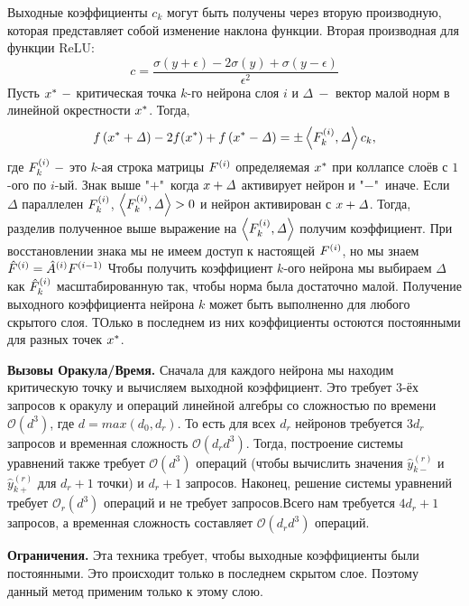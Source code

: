 Выходные коэффициенты $c_{k}$ могут быть получены через вторую производную, которая представляет собой изменение наклона функции. Вторая производная для функции ReLU:
$$c = \frac{\sigma(y+\epsilon)-2\sigma(y)+\sigma(y-\epsilon)}{\epsilon^{2}}$$
Пусть $\mathnormal{x}^{*} ~-$ критическая точка $k$-го нейрона слоя $i$ и $\mathit{\Delta} ~-$ вектор малой норм в линейной окрестности  $\mathnormal{x}^{*}$. Тогда,
$$\mathnormal{f}\left(\mathnormal{x}^{*}+\mathit{\Delta}\right)-2\mathnormal{f(x^{*})}+\mathnormal{f}\left(\mathnormal{x}^{*}-\mathit{\Delta}\right)=\pm\left\langle\mathnormal{F}_{k}^{\left(i\right)},\mathit{\Delta}\right\rangle c_{k},$$
где $\mathnormal{F}_{k}^{\left(i\right)} ~-$ это $k$-ая строка матрицы $\mathnormal{F}^{\left(i\right)}$ определяемая $\mathnormal{x}^{*}$ при коллапсе слоёв с $1$-ого по $i$-ый. Знак выше "$+$"\ когда $\mathnormal{x}+\mathit{\Delta}$ активирует нейрон и "$-$"\ иначе. Если $\mathit{\Delta}$ параллелен $\mathnormal{F}_{k}^{\left(i\right)}$, $\left\langle\mathnormal{F}_{k}^{\left(i\right)},\mathit{\Delta}\right\rangle > 0$ и нейрон активирован с $\mathnormal{x}+\mathit{\Delta}$. Тогда, разделив полученное выше выражение на $\left\langle\mathnormal{F}_{k}^{\left(i\right)},\mathit{\Delta}\right\rangle$ получим коэффициент. При восстановлении знака мы не имеем доступ к настоящей  $\mathnormal{F}^{\left(i\right)}$, но мы знаем $\hat{\mathnormal{F}}^{\left(i\right)}=\hat{A}^{(i)}\mathnormal{F}^{(i-1)}$ Чтобы получить коэффициент $k$-ого нейрона мы выбираем $\mathit{\Delta}$ как $\hat{\mathnormal{F}}_{k}^{\left(i\right)}$ масштабированную так, чтобы норма была достаточно малой. Получение выходного коэффициента нейрона $k$  может быть выполненно для любого скрытого слоя. ТОлько в последнем из них коэффициенты остоются постоянными для разных точек $\mathnormal{x}^{*}$.

\textbf{Вызовы Оракула/Время.} Сначала для каждого нейрона мы находим критическую точку и вычисляем выходной коэффициент. Это требует $3$-ёх запросов к оракулу и операций линейной алгебры со сложностью по времени $\mathcal{O}\left(d^{3}\right)$, где $d=max\left(d_{0}, d_{r}\right)$. То есть для всех $d_{r}$ нейронов требуется $3d_{r}$ запросов и временная сложность $\mathcal{O}\left(d_{r} d^{3}\right)$. Тогда, построение системы уравнений также требует $\mathcal{O}\left(d^{3}\right)$ операций (чтобы вычислить значения $\hat{y}_{k-}^{(r)}$ и $\hat{y}_{k+}^{(r)}$ для $d_{r}+1$ точки) и $d_{r}+1$ запросов. Наконец, решение системы уравнений требует $\mathcal{O}_{r}\left(d^{3}\right)$ операций и не требует запросов.Всего нам требуется $4d_{r}+1$ запросов, а временная сложность составляет $\mathcal{O}\left(d_{r}d^{3}\right)$ операций.

\textbf{Ограничения.} Эта техника требует, чтобы выходные коэффициенты были постоянными. Это происходит только в последнем скрытом слое. Поэтому данный метод применим только к этому слою.